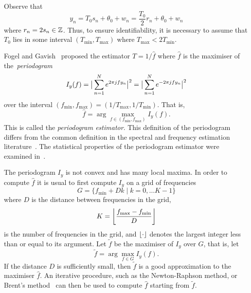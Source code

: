 \documentclass[10pt,twocolumn,twoside]{IEEEtran}
\begin{document}
Observe that
\[
y_n = T_0 s_n + \theta_0 + w_n = \frac{T_0}{2} r_n + \theta_0 + w_n
\]
where $r_n = 2s_n \in {\mathbb Z}$.  Thus, to ensure identifiability, it is necessary to assume that $T_0$ lies in some interval $(T_{\text{min}}, T_{\text{max}})$ where $T_{\text{max}} < 2T_{\text{min}}$.%


Fogel and Gavish~\cite{Fogel1988,Fogel1989_bit_synch_zero_crossings} proposed the estimator $\hat{T} = 1/\hat{f}$ where $\hat{f}$ is the maximiser of the~\emph{periodogram}
\[
I_y(f) = \big\vert  \sum_{n=1}^N e^{ 2\pi j f y_n}  \big\vert^2 = \big\vert  \sum_{n=1}^N e^{ -2\pi j f y_n}  \big\vert^2 
\]
over the interval $(f_{\text{min}}, f_{\text{max}}) = (1/T_{\text{max}}, 1/T_{\text{min}})$.  That is,
\[
\hat{f} = \arg\max_{f \in (f_{\text{min}}, f_{\text{max}})} I_y(f).
\] 
This is called the \emph{periodogram estimator}.  This definition of the periodogram differs from the common definition in the spectral and frequency estimation literature~\cite{Hannan_time_series_1967,Quinn2001}.  The statistical properties of the periodogram estimator were examined in~\cite{Quinn20013asilomar_period_est}.

The periodogram $I_y$ is not convex and has many local maxima.  In order to compute $\hat{f}$ it is usual to first compute $I_y$ on a grid of frequencies
\[
G = \{ f_{\text{min}} + Dk \mid k = 0, \dots K-1 \}
\]
where $D$ is the distance between frequencies in the grid, 
\[
K =  {\left\lfloor \frac{f_{\text{max}} - f_{\text{min}}}{D} \right\rfloor}
\]
is the number of frequencies in the grid, and ${\left\lfloor \cdot \right\rfloor}$ denotes the largest integer less than or equal to its argument.  
Let $\widetilde{f}$ be the maximiser of $I_y$ over $G$, that is, let
\[
\widetilde{f} = \arg\max_{f \in G} I_y(f).
\]
If the distance $D$ is sufficiently small, then $\widetilde{f}$ is a good approximation to the maximiser $\hat{f}$.  An iterative procedure, such as the Newton-Raphson method, or Brent's method~\cite[Ch.~5]{Brent_opt_no_derivs_1973} 
can then be used to compute $\hat{f}$ starting from $\widetilde{f}$.

\newcommand{\ymax}{y_{\text{max}}}
\newcommand{\ymin}{y_{\text{min}}}
\end{document}
